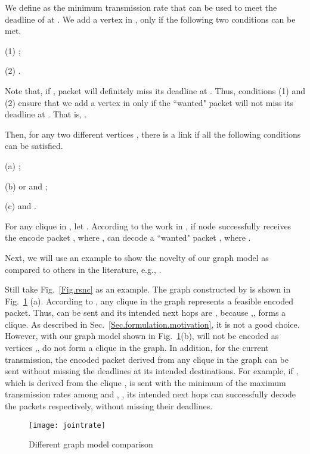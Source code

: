 \documentclass[journal]{IEEEtran}
\begin{document}
We define  as the minimum transmission rate that can be used to meet the deadline of  at .
We add a vertex  in , only if the following two conditions can be met.

(1) ;

(2) .

Note that, if , packet  will definitely miss its deadline at .
Thus, conditions (1) and (2) ensure that we add a vertex  in  only if the ``wanted" packet  will not miss its deadline at .
That is, .

Then, for any two different vertices , there is a link  if all the following conditions can be satisfied.

(a) ;

(b)  or  and ;

(c)  and .

For any clique  in , let . According to the work in \cite{ZX2010Broadcast6}, if node  successfully receives the encode packet , where ,  can decode a ``wanted" packet , where .

Next, we will use an example to show the novelty of our graph model as compared to others in the literature, e.g., \cite{ZX2010Broadcast6}.

Still take Fig.~\ref{Fig.rsnc} as an example. The graph constructed by \cite{ZX2010Broadcast6} is shown in Fig.~\ref{Fig.example} (a). According to \cite{ZX2010Broadcast6}, any clique in the graph represents a feasible encoded packet. Thus,  can be sent and its intended next hops are , because ,, forms a clique. As described in Sec.~\ref{Sec.formulation.motivation}, it is not a good choice.
However, with our graph model shown in Fig.~\ref{Fig.example}(b),  will not be encoded as vertices
,, do not form a clique in the graph. In addition, for the current transmission, the encoded packet derived from any clique in the graph can be sent without missing the deadlines at its intended destinations. For example, if , which is derived from the clique , is sent with the minimum of the maximum transmission rates among  and , , its intended next hops  can successfully decode the packets  respectively, without missing their deadlines.

\begin{figure}[t]
\begin{center}
\texttt{[image: jointrate]}\vspace{-0.08in}
\caption{Different graph model comparison}\vspace{-0.15in}\label{Fig.example}
\end{center}\vspace{-0.1in}
\end{figure}
\end{document}
